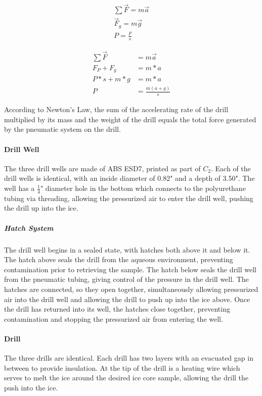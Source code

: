 \documentclass{article}
\begin{document}
\begin{gather*}
    \sum \vec{F} = m \vec{a} \\
    \vec{F}_g = m \vec{g}\\
    P = \frac{F}{s}
\end{gather*}

\begin{align*}
    \sum \vec{F} &= m \vec{a} \\
    F_P + F_g &= m*a \\
    P*s + m*g &= m*a \\
    P &= \frac{m (a+g)}{s}
\end{align*}

According to Newton's Law, the sum of the accelerating rate of the drill multiplied by its mass and the weight of the drill equals the total force generated by the pneumatic system on the drill. \par

\paragraph{Drill Well}
The three drill wells are made of ABS ESD7, printed as part of $C_2$. Each of the drill wells is identical, with an inside diameter of 0.82" and a depth of 3.50". The well has a $\frac{1}{4}$" diameter hole in the bottom which connects to the polyurethane tubing via threading, allowing the pressurized air to enter the drill well, pushing the drill up into the ice.
\subparagraph{Hatch System}
The drill well begins in a sealed state, with hatches both above it and below it. The hatch above seals the drill from the aqueous environment, preventing contamination prior to retrieving the sample. The hatch below seals the drill well from the pneumatic tubing, giving control of the pressure in the drill well. The hatches are connected, so they open together, simultaneously allowing pressurized air into the drill well and allowing the drill to push up into the ice above. Once the drill has returned into its well, the hatches close together, preventing contamination and stopping the pressurized air from entering the well.
\paragraph{Drill}
The three drills are identical. Each drill has two layers with an evacuated gap in between to provide insulation. At the tip of the drill is a heating wire which serves to melt the ice around the desired ice core sample, allowing the drill the push into the ice.
\end{document}
